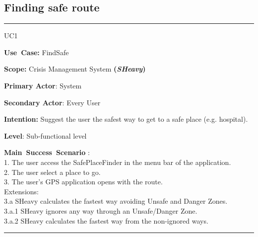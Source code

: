 \subsection{Finding safe route}
\vspace{0.5cm}
\hrule
\vspace{0.5cm}
\begin{lyxlist}{UC1}
\small{
\item [\textbf{Use~Case:}] FindSafe
\item [\textbf{Scope:}] Crisis Management System \textbf{(\emph{SHeavy})}
\item [\textbf{Primary Actor}:] System
\item [\textbf{Secondary Actor}:] Every User
\item [\textbf{Intention:}]Suggest the user the safest way to get to a safe
place (e.g. hospital).
\item [\textbf{Level}:]Sub-functional level
\item [\textbf{Main~Success~Scenario}]:\\
1. The user access the SafePlaceFinder in the menu bar of the application.\\
2. The user select a place to go.\\
3. The user's GPS application opens with the route.\\
Extensions:\\
3.a SHeavy calculates the fastest way avoiding Unsafe and Danger Zones.\\
	3.a.1 SHeavy ignores any way through an Unsafe/Danger Zone.\\
	3.a.2 SHeavy calculates the fastest way from the non-ignored ways.\\
\item 
}
\end{lyxlist}
\hrule
\vspace{0.5cm}

